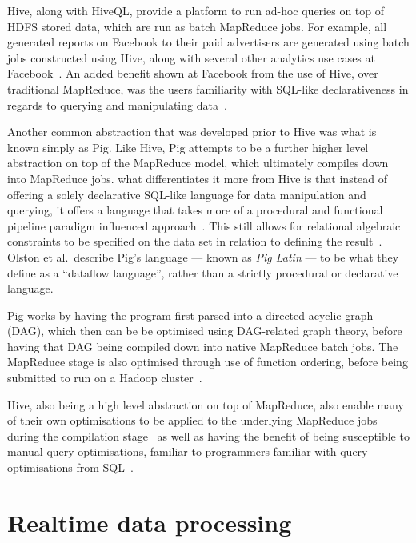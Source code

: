 Hive, along with HiveQL, provide a platform to run ad-hoc queries on top of HDFS stored data, which are run as batch
MapReduce jobs. For example, all generated reports on Facebook to their paid advertisers are generated using batch jobs
constructed using Hive, along with several other analytics use cases at Facebook~\cite{thusoo2010data}. An added benefit
shown at Facebook from the use of Hive, over traditional MapReduce, was the users familiarity with SQL-like
declarativeness in regards to querying and manipulating data~\cite{borthakur2011apache}.

Another common abstraction that was developed prior to Hive was what is known simply as Pig. Like Hive, Pig attempts to
be a further higher level abstraction on top of the MapReduce model, which ultimately compiles down into MapReduce jobs.
what differentiates it more from Hive is that instead of offering a solely declarative SQL-like language for data
manipulation and querying, it offers a language that takes more of a procedural and functional pipeline paradigm
influenced approach~\cite{olston2011nova}. This still allows for relational algebraic constraints to be specified on the data set in relation to defining the
result~\cite{olston2008pig}. Olston et al.\ describe Pig's language --- known as \textit{Pig Latin} --- to be what they
define as a ``dataflow language'', rather than a strictly procedural or declarative language.

Pig works by having the program first parsed into a directed acyclic graph (DAG), which then can be be optimised using
DAG-related graph theory, before having that DAG being compiled down into native MapReduce batch jobs. The MapReduce
stage is also optimised through use of function ordering, before being submitted to run on a Hadoop
cluster~\cite{stewart2011comparing}.

Hive, also being a high level abstraction on top of MapReduce, also enable many of their own
optimisations to be applied to the underlying MapReduce jobs during the compilation
stage~\cite{gates2009building,thusoo2010hive} as well as having the benefit of being susceptible to manual query
optimisations, familiar to programmers familiar with query optimisations from SQL~\cite{gruenheid2011query}.






\section{Realtime data processing} %
\label{sub:realtime_data_processing}

